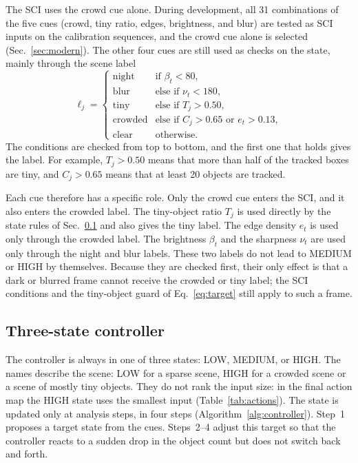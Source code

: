\documentclass[journal]{new-aiaa}
\begin{document}
The SCI uses the crowd cue alone. During development, all 31 combinations of
the five cues (crowd, tiny ratio, edges, brightness, and blur) are tested as
SCI inputs on the calibration sequences, and the crowd cue alone is selected
(Sec.~\ref{sec:modern}). The other four cues are still used as checks on the
state, mainly through the scene label
\begin{equation}
\ell_j=\begin{cases}
\text{night}   & \text{if } \beta_t<80,\\
\text{blur}    & \text{else if } \nu_t<180,\\
\text{tiny}    & \text{else if } T_j>0.50,\\
\text{crowded} & \text{else if } C_j>0.65 \text{ or } e_t>0.13,\\
\text{clear}   & \text{otherwise.}
\end{cases}
\label{eq:label}
\end{equation}
The conditions are checked from top to bottom, and the first one that holds
gives the label. For example, $T_j>0.50$ means that more than half of the
tracked boxes are tiny, and $C_j>0.65$ means that at least 20 objects are
tracked.

Each cue therefore has a specific role. Only the crowd cue enters the SCI,
and it also enters the crowded label. The tiny-object ratio $T_j$ is used directly by the state rules of
Sec.~\ref{sec:states} and also gives the tiny label. The edge density $e_t$
is used only through the crowded label. The brightness $\beta_t$ and the
sharpness $\nu_t$ are used only through the night and blur labels. These two
labels do not lead to MEDIUM or HIGH by themselves. Because they are checked
first, their only effect is that a dark or blurred frame cannot receive the
crowded or tiny label; the SCI conditions and the tiny-object guard of
Eq.~\eqref{eq:target} still apply to such a frame.

\subsection{Three-state controller}\label{sec:states}
The controller is always in one of three states: LOW, MEDIUM, or HIGH. The
names describe the scene: LOW for a sparse scene, HIGH for a crowded scene or
a scene of mostly tiny objects. They do not rank the input size: in the final
action map the HIGH state uses the smallest input (Table~\ref{tab:actions}).
The state is updated only at analysis steps, in four steps
(Algorithm~\ref{alg:controller}). Step~1 proposes a target state from the
cues. Steps~2--4 adjust this target so that the controller reacts to a sudden
drop in the object count but does not switch back and forth.
\end{document}
